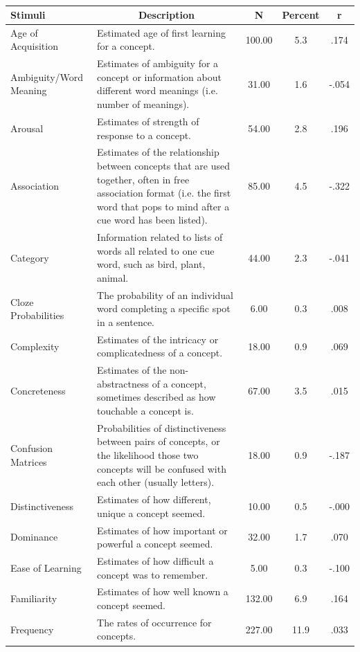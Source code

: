 \documentclass[english,man]{apa6}
\theoremstyle{definition}
\theoremstyle{definition}
\theoremstyle{definition}
\theoremstyle{remark}
\begin{document}
\begin{table}[tbp]
\begin{center}
\begin{threeparttable}
\caption{\label{tab:tag-table}}
\begin{tabular}{llccc}
\toprule
Stimuli & \multicolumn{1}{c}{Description} & \multicolumn{1}{c}{N} & \multicolumn{1}{c}{Percent} & \multicolumn{1}{c}{r}\\
\midrule
Age of Acquisition & Estimated age of first learning for a concept. & 100.00 & 5.3 & .174\\
Ambiguity/Word Meaning & Estimates of ambiguity for a concept or information about different word meanings (i.e. number of meanings). & 31.00 & 1.6 & -.054\\
Arousal & Estimates of strength of response to a concept. & 54.00 & 2.8 & .196\\
Association & Estimates of the relationship between concepts that are used together, often in free association format (i.e. the first word that pops to mind after a cue word has been listed). & 85.00 & 4.5 & -.322\\
Category & Information related to lists of words all related to one cue word, such as bird, plant, animal. & 44.00 & 2.3 & -.041\\
Cloze Probabilities & The probability of an individual word completing a specific spot in a sentence. & 6.00 & 0.3 & .008\\
Complexity & Estimates of the intricacy or complicatedness of a concept. & 18.00 & 0.9 & .069\\
Concreteness & Estimates of the non-abstractness of a concept, sometimes described as how touchable a concept is. & 67.00 & 3.5 & .015\\
Confusion Matrices & Probabilities of distinctiveness between pairs of concepts, or the likelihood those two concepts will be confused with each other (usually letters). & 18.00 & 0.9 & -.187\\
Distinctiveness & Estimates of how different, unique a concept seemed. & 10.00 & 0.5 & -.000\\
Dominance & Estimates of how important or powerful a concept seemed. & 32.00 & 1.7 & .070\\
Ease of Learning & Estimates of how difficult a concept was to remember. & 5.00 & 0.3 & -.100\\
Familiarity & Estimates of how well known a concept seemed. & 132.00 & 6.9 & .164\\
Frequency & The rates of occurrence for concepts. & 227.00 & 11.9 & .033\\

\end{tabular}
\end{threeparttable}
\end{center}
\end{table}
\end{document}
